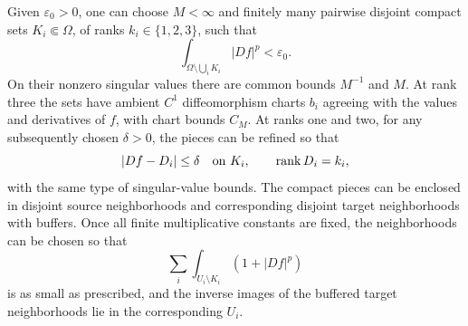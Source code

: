 \begin{lemma}\label{la:jet-selection}
Given $\varepsilon_0>0$, one can choose $M<\infty$ and finitely many
pairwise disjoint compact sets $K_i\Subset\Omega$, of ranks
$k_i\in\{1,2,3\}$, such that
\begin{equation}\label{la:jet-tail}
 \int_{\Omega\setminus\bigcup_iK_i}|Df|^p<\varepsilon_0.
\end{equation}
On their nonzero singular values there are common bounds $M^{-1}$
and $M$.  At rank three the sets have ambient $C^1$ diffeomorphism
charts $b_i$ agreeing with the values and derivatives of $f$, with
chart bounds $C_M$.  At ranks one and two, for any subsequently chosen
$\delta>0$, the pieces can be refined so that
\begin{equation}\label{la:rank-model}
 |Df-D_i|\le\delta\quad\hbox{on }K_i,
 \qquad \operatorname{rank} D_i=k_i,
\end{equation}
with the same type of singular-value bounds.  The compact pieces can
be enclosed in disjoint source neighborhoods and corresponding
disjoint target neighborhoods with buffers.  Once all finite
multiplicative constants are fixed, the neighborhoods can be chosen
so that
\begin{equation}\label{la:excess-neighborhood}
 \sum_i\int_{U_i\setminus K_i}(1+|Df|^p)
\end{equation}
is as small as prescribed, and the inverse images of the buffered
target neighborhoods lie in the corresponding $U_i$.
\end{lemma}

